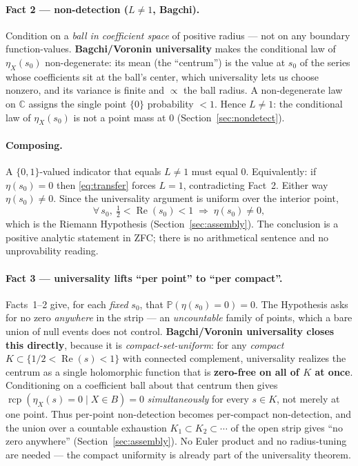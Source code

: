 \documentclass[11pt,a4paper]{article}
\theoremstyle{definition}
\newcommand{\Rea}{\operatorname{Re}}
\newcommand{\etaX}{\eta_X}
\newcommand{\rcp}{\operatorname{rcp}}
\begin{document}
\paragraph{Fact 2 --- non-detection (\(L\neq 1\), Bagchi).} Condition on a \emph{ball in
coefficient space} of positive radius --- not on any boundary function-values.
\textbf{Bagchi/Voronin universality} makes the conditional law of \(\etaX(s_0)\)
non-degenerate: its mean (the ``centrum'') is the value at \(s_0\) of the series whose
coefficients sit at the ball's center, which universality lets us choose nonzero, and its
variance is finite and \(\propto\) the ball radius. A non-degenerate law on \(\mathbb{C}\)
assigns the single point \(\{0\}\) probability \(<1\). Hence \(L\neq 1\): the conditional
law of \(\etaX(s_0)\) is not a point mass at \(0\) (Section~\ref{sec:nondetect}).

\paragraph{Composing.} A \(\{0,1\}\)-valued indicator that equals \(L\neq 1\) must equal
\(0\). Equivalently: if \(\eta(s_0)=0\) then \eqref{eq:transfer} forces \(L=1\),
contradicting Fact~2. Either way \(\eta(s_0)\neq 0\). Since the universality argument is
uniform over the interior point,
\[
  \forall\,s_0,\ \tfrac12<\Rea(s_0)<1 \;\Longrightarrow\; \eta(s_0)\neq 0,
\]
which is the Riemann Hypothesis (Section~\ref{sec:assembly}). The conclusion is a positive
analytic statement in ZFC; there is no arithmetical sentence and no unprovability reading.

\paragraph{Fact 3 --- universality lifts ``per point'' to ``per compact''.} Facts~1--2
give, for each \emph{fixed} \(s_0\), that \(\mathbb{P}(\eta(s_0)=0)=0\). The Hypothesis asks for
no zero \emph{anywhere} in the strip --- an \emph{uncountable} family of points, which a bare
union of null events does not control. \textbf{Bagchi/Voronin universality closes this
directly}, because it is \emph{compact-set-uniform}: for any \emph{compact}
\(K\subset\{1/2<\Rea(s)<1\}\) with connected complement, universality realizes the centrum as a
single holomorphic function that is \textbf{zero-free on all of \(K\) at once}. Conditioning on a
coefficient ball about that centrum then gives \(\rcp(\etaX(s)=0\mid X\in B)=0\)
\emph{simultaneously} for every \(s\in K\), not merely at one point. Thus per-point non-detection
becomes per-compact non-detection, and the union over a countable exhaustion
\(K_1\subset K_2\subset\cdots\) of the open strip gives ``no zero anywhere''
(Section~\ref{sec:assembly}). No Euler product and no radius-tuning are needed --- the compact
uniformity is already part of the universality theorem.
\end{document}
